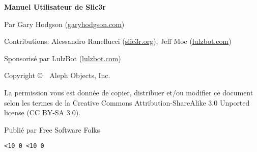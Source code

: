 \clearpage\null\vfill
\begingroup
\thispagestyle{empty}
\footnotesize\raggedright
\setlength{\parskip}{0.5\baselineskip}

\textbf{Manuel Utilisateur de Slic3r}

Par Gary Hodgson (\href{http://garyhodgson.com}{garyhodgson.com})

Contributions: Alessandro Ranellucci (\href{http://slic3r.org}{slic3r.org}), Jeff Moe (\href{http://lulzbot.com}{lulzbot.com})

Sponsoris\'e par LulzBot (\href{http://lulzbot.com}{lulzbot.com})

Copyright \copyright\ \the\year\ Aleph Objects, Inc.\par
La permission vous est donn\'ee de copier, distribuer et\slash ou modifier
ce document selon les termes de la
Creative Commons Attribution-ShareAlike 3.0 Unported license
(CC BY-SA 3.0).

Publi\'e par Free Software Folks

\hfill\texttt{\the\year\ifnum\month<10 0\fi\the\month
                \ifnum\day  <10 0\fi\the\day}
\endgroup
\pagebreak{}
